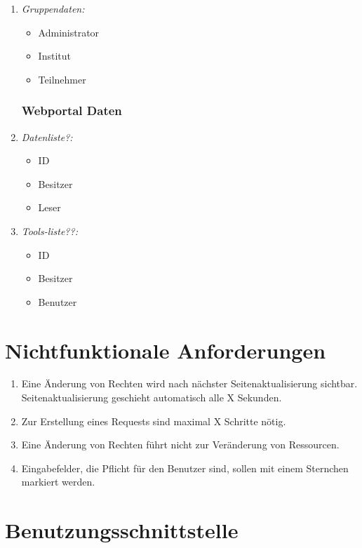 \documentclass[parskip=full,11pt]{scrartcl}
\def\threedigits#1{%
  \ifnum#1<100 0\fi
  \ifnum#1<10 0\fi
  \number#1}
\begin{document}
\begin{enumerate}[label={\textbf{/D\protect\threedigits{\theenumi}/}}, leftmargin=*]
\begin{itemize}
\end{itemize}

\item \textit{Gruppendaten:}
\begin{itemize}
\item Administrator
\item Institut
\item Teilnehmer
 \end{itemize}
 
\subsubsection{Webportal Daten}
\item \textit{Datenliste?:}
\begin{itemize}
\item ID
\item Besitzer
\item Leser
 \end{itemize}
 
 \item \textit{Tools-liste??:}
\begin{itemize}
\item ID
\item Besitzer
\item Benutzer
 \end{itemize}

\end{enumerate}
\section{Nichtfunktionale Anforderungen}
\begin{enumerate}[label={\textbf{/NF\protect\threedigits{\theenumi}}}, leftmargin=*]
\item Eine Änderung von Rechten wird nach nächster Seitenaktualisierung sichtbar. Seitenaktualisierung geschieht automatisch alle X Sekunden.
\item Zur Erstellung eines Requests sind maximal X Schritte nötig.
\item Eine Änderung von Rechten führt nicht zur Veränderung von Ressourcen.
\item Eingabefelder, die Pflicht für den Benutzer sind, sollen mit einem Sternchen markiert werden.
\end{enumerate}



\section{Benutzungsschnittstelle}
\end{document}
